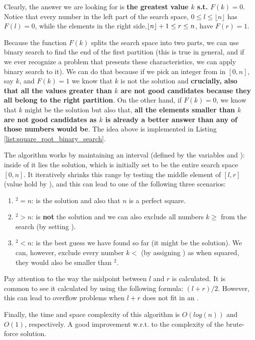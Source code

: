 Clearly, the answer we are looking for is \textbf{the greatest value $k$ s.t. $F(k) = 0$}. 
Notice that every number in the left part of the search space, $0 \leq l \leq \lfloor n \rfloor$ has $F(l) = 0$, while the elements in the right side,$\lfloor n\rfloor+1 \leq r \leq n$, have $F(r) = 1$.

Because the function $F(k)$ splits the search space into two parts, we can use
binary search to find the end of the first partition (this is true in general, and if we ever recognize a problem that presents these characteristics, we can apply binary search to it). 
We can do that because if we pick an integer from in $[0,n]$, say $k$, and $F(k) = 1$ we know that $k$ is not the solution and \textbf{crucially, also that
all the values greater than $k$ are not good candidates because they all belong to the right partition}.
On the other hand, if $F(k) = 0$, we know that $k$ might be the solution but also that, \textbf{all the elements smaller than $k$ are not good candidates as $k$ is already a better answer than any of those numbers would be}.
The idea above is implemented in Listing \ref{list:square_root_binary_search}. 



The algorithm works by maintaining an interval (defined by the variables  and ): inside of it lies the solution,  which is initially set to be the entire search space $[0,n]$.
It iteratively shrinks this range by testing the middle element of $[l,r]$ (value hold by ), and this can lead to one of the following three scenarios:

 \begin{enumerate}
	 \item {}$^2  = n$:  is the solution and also that $n$ is a perfect square.
	 \item {}$^2 > n$:  is \textbf{not} the solution and we can also exclude
	 all numbers $k \geq $  from the search (by setting ).
	 \item {}$^2  < n$:  is the best guess we have found so far (it might be the solution). We can, however, exclude every number $k <$ (by assigning ) as when squared, they would also be smaller than $^2$.
 \end{enumerate}

 Pay attention to the way the midpoint between $l$ and $r$ is calculated. 
 It is common to see it calculated by using the following formula: $(l+r)/2$.
 However, this can lead to overflow problems when $l+r$ does not fit in an .

Finally, the time and space complexity of this algorithm is $O(log(n))$ and $O(1)$, respectively. A good improvement w.r.t. to the complexity of the brute-force solution.


